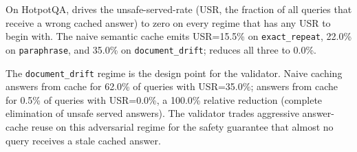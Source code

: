 On HotpotQA, \sys{} drives the unsafe-served-rate (USR, the fraction of all queries that receive a wrong cached answer) to zero on every regime that has any USR to begin with. The naive semantic cache emits USR=15.5\% on \texttt{exact\_repeat}, 22.0\% on \texttt{paraphrase}, and 35.0\% on \texttt{document\_drift}; \sys{} reduces all three to 0.0\%.

The \texttt{document\_drift} regime is the design point for the validator. Naive caching answers from cache for 62.0\% of queries with USR=35.0\%; \sys{} answers from cache for 0.5\% of queries with USR=0.0\%, a 100.0\% relative reduction (complete elimination of unsafe served answers). The validator trades aggressive answer-cache reuse on this adversarial regime for the safety guarantee that almost no query receives a stale cached answer.
